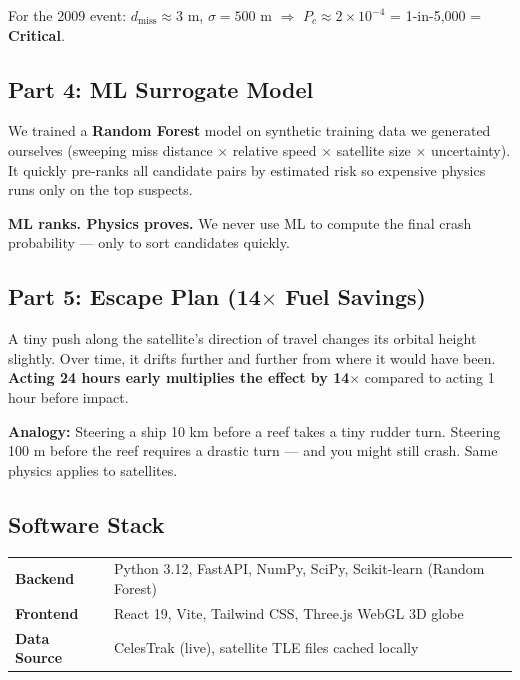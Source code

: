 \documentclass[11pt,a4paper]{article}
\begin{document}
\begin{tcolorbox}[colback=lightgray, colframe=gray!30]
\small For the 2009 event: $d_{\text{miss}} \approx 3$ m, $\sigma = 500$ m $\Rightarrow$ $P_c \approx 2\times10^{-4}$ = 1-in-5,000 = \textbf{Critical}.
\end{tcolorbox}

\subsection{Part 4: ML Surrogate Model}

We trained a \textbf{Random Forest} model on synthetic training data we generated ourselves (sweeping miss distance $\times$ relative speed $\times$ satellite size $\times$ uncertainty). It quickly pre-ranks all candidate pairs by estimated risk so expensive physics runs only on the top suspects.

\begin{tcolorbox}[colback=lightgray, colframe=gray!30]
\small \textbf{ML ranks. Physics proves.} We never use ML to compute the final crash probability --- only to sort candidates quickly.
\end{tcolorbox}

\subsection{Part 5: Escape Plan (14$\times$ Fuel Savings)}

A tiny push along the satellite's direction of travel changes its orbital height slightly. Over time, it drifts further and further from where it would have been. \textbf{Acting 24 hours early multiplies the effect by 14$\times$} compared to acting 1 hour before impact.

\begin{tcolorbox}[colback=lightgray, colframe=gray!30]
\small \textbf{Analogy:} Steering a ship 10 km before a reef takes a tiny rudder turn. Steering 100 m before the reef requires a drastic turn --- and you might still crash. Same physics applies to satellites.
\end{tcolorbox}

\subsection*{Software Stack}
\begin{tcolorbox}[colback=lightgray, colframe=gray!30]
\begin{tabular}{@{}ll@{}}
\textbf{Backend} & Python 3.12, FastAPI, NumPy, SciPy, Scikit-learn (Random Forest) \\
\textbf{Frontend} & React 19, Vite, Tailwind CSS, Three.js WebGL 3D globe \\
\textbf{Data Source} & CelesTrak (live), satellite TLE files cached locally \\
\end{tabular}
\end{tcolorbox}
\end{document}
